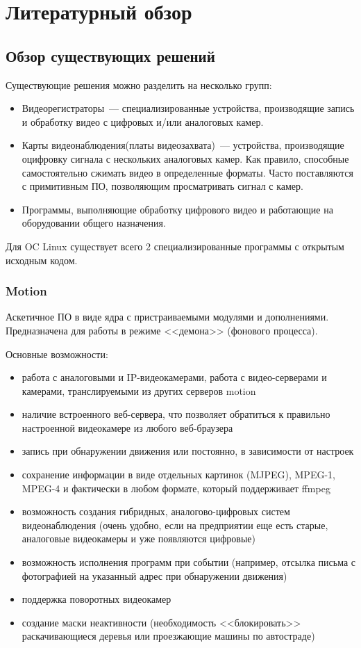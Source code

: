 \chapter{Литературный обзор}
\section{Обзор существующих решений}

Существующие решения можно разделить на несколько групп:
\smallskip
\begin{itemize}
	\item
	Видеорегистраторы~--- специализированные устройства,
	производящие запись и обработку видео с цифровых и/или аналоговых камер.
	\item
	Карты видеонаблюдения(платы видеозахвата)~--- устройства, производящие оцифровку
	сигнала с нескольких аналоговых камер. Как правило, способные самостоятельно сжимать
	видео в определенные форматы. Часто поставляются с примитивным ПО, позволяющим
	просматривать сигнал с камер.
	\item
	Программы, выполняющие обработку цифрового видео и работающие на оборудовании общего
	назначения.
\end{itemize}

\medskip

Для OC Linux существует всего 2 специализированные программы с открытым исходным кодом.

\subsection{Motion}

Аскетичное ПО в виде ядра с пристраиваемыми модулями и дополнениями.
Предназначена для работы в режиме <<демона>> (фонового процесса).

\medskip

Основные возможности:
\smallskip
\begin{itemize}
	\item
	работа с аналоговыми и IP-видеокамерами, работа с видео-серверами и камерами,
	транслируемыми из других серверов motion
	\item
	наличие встроенного веб-сервера, что позволяет обратиться к правильно
	настроенной видеокамере из любого веб-браузера
	\item
	запись при обнаружении движения или постоянно, в зависимости от настроек
	\item
	сохранение информации в виде отдельных картинок (MJPEG), MPEG-1, MPEG-4 и
	фактически в любом формате, который поддерживает ffmpeg
	\item
	возможность создания гибридных, аналогово-цифровых систем видеонаблюдения
	(очень удобно, если на предприятии еще есть старые, аналоговые видеокамеры
	и уже появляются цифровые)
	\item
	возможность исполнения программ при событии
	(например, отсылка письма с фотографией на указанный адрес при обнаружении движения)
	\item
	поддержка поворотных видеокамер
	\item
	создание маски неактивности (необходимость <<блокировать>> раскачивающиеся
	деревья или проезжающие машины по автостраде)
\end{itemize}

